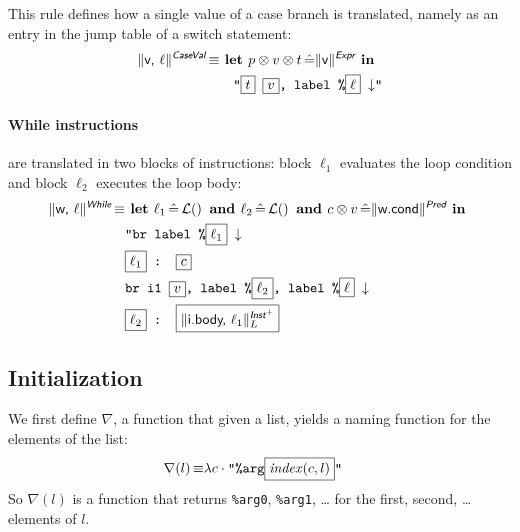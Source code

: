 \documentclass{article}
\newcommand{\trad}[2]{\ensuremath{\lVert \textsf{#1} \rVert^{\textit{#2}}}}
\newcommand{\nl}[0]{\ensuremath{\downarrow}}
\DeclareMathOperator{\isdef}{\equiv}
\DeclareMathOperator{\lbl}{\mathcal{L}()}
\newcommand{\llvm}[1]{\texttt{#1}}
\newcommand{\B}[1]{\textsf{#1}}
\newcommand{\ListOf}[1]{$\mbox{#1}^+$}
\newcommand{\LET}[0]{\textbf{ let }}
\DeclareMathOperator{\BE}{\hat{=}}
\newcommand{\IN}[0]{\textbf{ in }}
\newcommand{\AND}[0]{\textbf{ and }}
\newcommand{\PH}[1]{\framebox{$#1$}}
\newcommand{\sep}[0]{\otimes}
\begin{document}
This rule defines how a single value of a case branch is translated, namely
as an entry in the jump table of a switch statement:
\begin{align*}
  \trad{v, $\ell$}{\B{CaseVal}} \isdef & \LET p \sep v \sep t \BE \trad{v}{\B{Expr}} \IN \\
  & \quad \llvm{"\PH{t} \PH{v}, label \%\PH{\ell} \nl"}
\end{align*}

\paragraph{While instructions} are translated in two blocks of instructions:
block $\ell_1$ evaluates the loop condition and block $\ell_2$ executes the loop
body:
\begin{align*}
\begin{split}
\trad{w, $\ell$}{\B{While}} \isdef
  & \LET \ell_1 \BE \lbl \AND \ell_2 \BE \lbl \AND c \sep v \BE \trad{w.cond}{\B{Pred}} \IN \\
  & \llvm{"br label \%\PH{\ell_1} \nl} \\
  & \llvm{\PH{\ell_1} : \PH{c}} \\
  & \llvm{br i1 \PH{v}, label \%\PH{\ell_2}, label \%\PH{\ell} \nl} \\
  & \llvm{\PH{\ell_2} : \PH{\trad{i.body, $\ell_1$}{\ListOf{\B{Inst}}}_L}}
\end{split}
\end{align*}

\subsection{Initialization}
\label{sec:trad-init}

\newcommand{\argname}[0]{\ensuremath{\mathsf{\nabla}}}
\newcommand{\components}[0]{\ensuremath{\textsf{st-comp*}}}

We first define $\argname$, a function that given a list, yields a naming
function for the elements of the list:
\begin{align*}
  \argname(l) \isdef
  & \lambda c \cdot \llvm{"\%arg\PH{\mathit{index}(c, l)}"}
\end{align*}
So $\argname(l)$ is a function that returns \llvm{\%arg0}, \llvm{\%arg1}, \ldots
for the first, second, \ldots elements of $l$.
\end{document}
